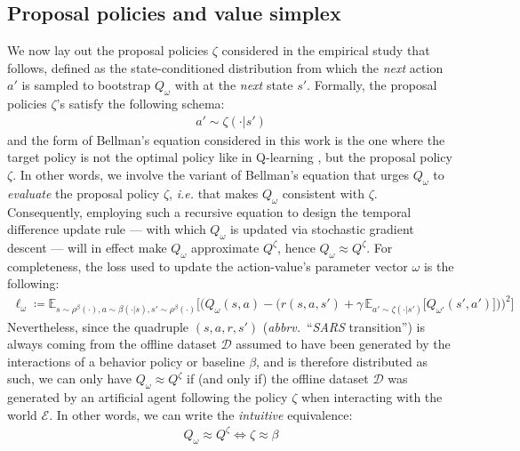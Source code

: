 \subsection{Proposal policies and value simplex}
\label{proposalsimplex}
We now lay out the proposal policies $\zeta$ considered in the empirical study that follows,
defined as the state-conditioned distribution from which the \textit{next} action $a'$ is sampled
to bootstrap $Q_\omega$ with at the \textit{next} state $s'$.
Formally, the proposal policies $\zeta$'s satisfy the following schema:
\begin{align}
  a' \sim \zeta(\cdot | s')
\end{align}
and the form of Bellman's equation considered in this work is the one where the target policy is not
the optimal policy like in Q-learning \cite{Watkins1989-ir, Watkins1992-gl},
but the proposal policy $\zeta$. In other words, we involve the variant of Bellman's equation
that urges $Q_\omega$ to \textit{evaluate} the proposal policy $\zeta$,
\textit{i.e.} that makes $Q_\omega$ consistent with $\zeta$.
Consequently, employing such a recursive equation to design the temporal difference update rule
--- with which $Q_\omega$ is updated via stochastic gradient descent ---
will in effect make $Q_\omega$ approximate $Q^\zeta$, hence $Q_\omega \approx Q^\zeta$.
For completeness,
the loss used to update the action-value's parameter vector $\omega$ is the following:
\begin{align}
  \ell_\omega \coloneqq
  \mathbb{E}_{s \sim \rho^\beta(\cdot), a \sim \beta(\cdot | s), s' \sim \rho^\beta(\cdot)}
  \bigg[
  \Big(
  Q_\omega(s,a) -
  \big(
  r(s, a, s') + \gamma \, \mathbb{E}_{a' \sim \zeta(\cdot | s')}
  \big[
  Q_{\omega'}(s',a')
  \big]
  \big)
  \Big)^2
  \bigg]
  \label{criticloss}
\end{align}
Nevertheless, since the quadruple $(s, a, r, s')$ (\textit{abbrv.}~``\textit{SARS} transition'')
is always coming from the offline dataset $\mathcal{D}$
assumed to have been generated by the interactions of a behavior policy or baseline $\beta$,
and is therefore distributed as such, we can only have $Q_\omega \approx Q^\zeta$
if (and only if) the offline dataset $\mathcal{D}$ was generated by
an artificial agent following the policy $\zeta$ when interacting with the world $\mathcal{E}$.
In other words, we can write the \emph{intuitive} equivalence:
\begin{align}
  Q_\omega \approx Q^\zeta
  \iff
  \zeta \approx \beta
  \label{omegazetaequiv}
\end{align}
